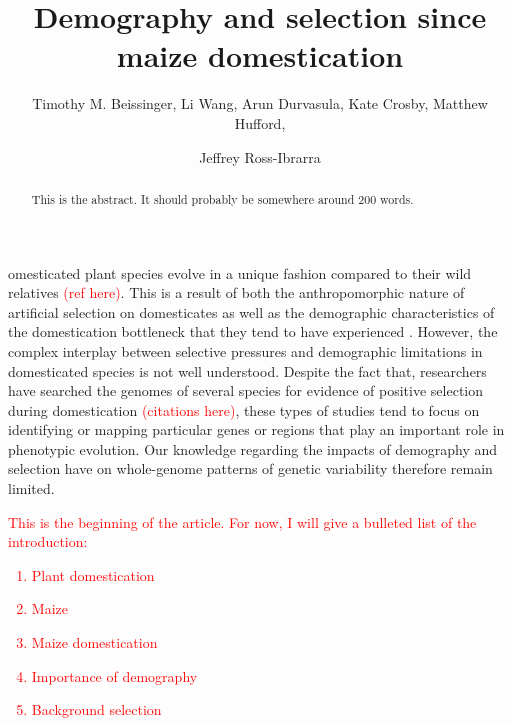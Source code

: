 \documentclass{pnastwo}
\begin{document}
\title{Demography and selection since maize domestication}
\author{Timothy M. Beissinger, Li Wang, Arun
  Durvasula, Kate Crosby, Matthew Hufford, \and Jeffrey
  Ross-Ibrarra }


\maketitle

\begin{article}

\begin{abstract}
This is the abstract. It should probably be somewhere around 200 words.
\end{abstract}

omesticated plant species evolve in a unique fashion
compared to their wild relatives \textcolor{red}{(ref here)}. This
is a result of both the anthropomorphic nature of artificial selection on
domesticates \cite{purugganan2009} as well as the demographic characteristics of the domestication
bottleneck that they tend to have experienced
\cite{ross2007}. However, the
complex interplay between selective pressures and demographic limitations in
domesticated species is not well understood. Despite the fact that,
researchers have searched the genomes of several species for evidence
of positive selection during domestication
\textcolor{red}{(citations here)}, these types of studies tend to focus on
identifying or mapping particular genes or regions that play an
important role in phenotypic evolution. Our knowledge regarding the impacts of demography and
selection have on whole-genome patterns of genetic variability therefore remain limited.

\textcolor{red}{
This is the beginning of the article. For now, I will give a
bulleted list of the introduction:
\begin{enumerate}
\item Plant domestication
\item Maize
\item Maize domestication
\item Importance of demography
\item Background selection
\end{enumerate}
}




\end{article}
\end{document}
